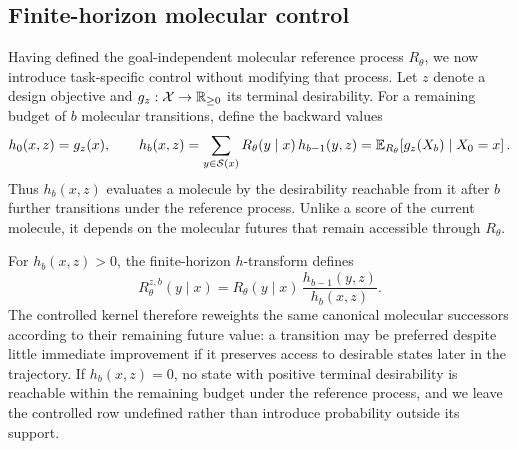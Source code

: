 \subsection{Finite-horizon molecular control}
\label{sec:control}
\label{sec:doob}

Having defined the goal-independent molecular reference process $R_\theta$, we now introduce task-specific control without modifying that process. Let $z$ denote a design objective and $g_z:\mathcal{X}\rightarrow\mathbb{R}_{\ge0}$ its terminal desirability. For a remaining budget of $b$ molecular transitions, define the backward values
\begin{equation}
h_0(x,z)=g_z(x),\qquad
h_b(x,z)=\sum_{y\in\mathcal{S}(x)}R_\theta(y\mid x)\,h_{b-1}(y,z)
=\mathbb{E}_{R_\theta}\!\left[g_z(X_b)\mid X_0=x\right].
\label{eq:backward}
\end{equation}
Thus $h_b(x,z)$ evaluates a molecule by the desirability reachable from it after $b$ further transitions under the reference process. Unlike a score of the current molecule, it depends on the molecular futures that remain accessible through $R_\theta$.

For $h_b(x,z)>0$, the finite-horizon $h$-transform defines
\begin{equation}
R^{z,b}_\theta(y\mid x)=R_\theta(y\mid x)\,\frac{h_{b-1}(y,z)}{h_b(x,z)}.
\label{eq:doob}
\end{equation}
The controlled kernel therefore reweights the same canonical molecular successors according to their remaining future value: a transition may be preferred despite little immediate improvement if it preserves access to desirable states later in the trajectory. If $h_b(x,z)=0$, no state with positive terminal desirability is reachable within the remaining budget under the reference process, and we leave the controlled row undefined rather than introduce probability outside its support.

